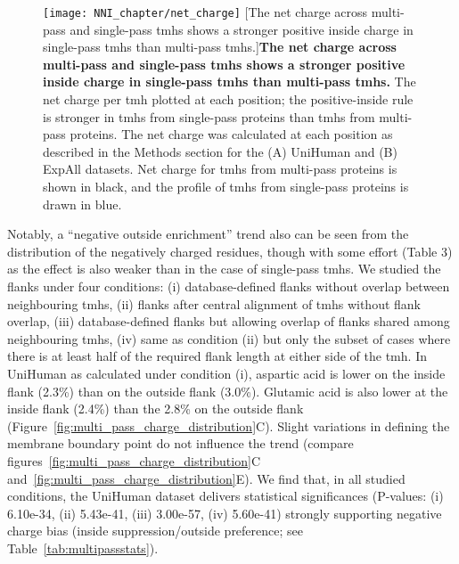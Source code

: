 \begin{figure}[!ht]
\centering
\texttt{[image: NNI\_chapter/net\_charge]}
[The net charge across multi-pass and single-pass \gls{tmh}s shows a stronger positive inside charge in single-pass \gls{tmh}s than multi-pass \gls{tmh}s.]{\textbf{The net charge across multi-pass and single-pass \gls{tmh}s shows a stronger positive inside charge in single-pass \gls{tmh}s than multi-pass \gls{tmh}s.}
The net charge per \gls{tmh} plotted at each position; the positive-inside rule is stronger in \gls{tmh}s from single-pass proteins than \gls{tmh}s from multi-pass proteins.
The net charge was calculated at each position as described in the Methods section for the (A) UniHuman and (B) ExpAll datasets.
Net charge for \gls{tmh}s from multi-pass proteins is shown in black, and the profile of \gls{tmh}s from single-pass proteins is drawn in blue.}

\label{fig:net_charge}
\end{figure}

Notably, a ``negative outside enrichment'' trend also can be seen from the distribution of the negatively charged residues, though with some effort (Table 3) as the effect is also weaker than in the case of single-pass \gls{tmh}s.
We studied the flanks under four conditions: (i) database-defined flanks without overlap between neighbouring \gls{tmh}s, (ii) flanks after central alignment of \gls{tmh}s without flank overlap, (iii) database-defined flanks but allowing overlap of flanks shared among neighbouring \gls{tmh}s, (iv) same as condition (ii) but only the subset of cases where there is at least half of the required flank length at either side of the \gls{tmh}.
In UniHuman as calculated under condition (i), aspartic acid is lower on the inside flank (2.3\%) than on the outside flank (3.0\%).
Glutamic acid is also lower at the inside flank (2.4\%) than the 2.8\% on the outside flank (Figure~\ref{fig:multi_pass_charge_distribution}C).
Slight variations in defining the membrane boundary point do not influence the trend (compare figures~\ref{fig:multi_pass_charge_distribution}C and~\ref{fig:multi_pass_charge_distribution}E).
We find that, in all studied conditions, the UniHuman dataset delivers statistical significances (P-values: (i) 6.10e-34, (ii) 5.43e-41, (iii) 3.00e-57, (iv) 5.60e-41) strongly supporting negative charge bias (inside suppression/outside preference; see Table~\ref{tab:multipassstats}).


